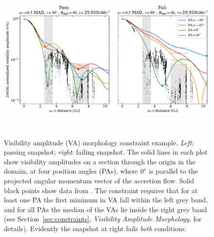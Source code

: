 \begin{figure}
  \centering
  \includegraphics[height=3.25in]{figures/passfail_va.pdf}
  \caption{Visibility amplitude (VA) morphology  constraint example.
    \emph{Left}: passing snapshot;
    \emph{right}: failing snapshot.
    The solid lines in each plot show visibility amplitudes on a section through the origin in the \uv domain, at four position angles (PAs), where $0\degree$ is parallel to the projected angular momentum vector of the accretion flow.
    Solid black points show data from \aprilvii.
    The \vam constraint requires that for at least one PA the first minimum in VA fall within the left grey band, and for all PAs the median of the VAs lie inside the right grey band (see Section~\ref{sec:constraints}, \emph{Visibility Amplitude Morphology}, for details).
    Evidently the snapshot at right fails {\em both} conditions.}
  \label{fig:passfail_va}
\end{figure}

